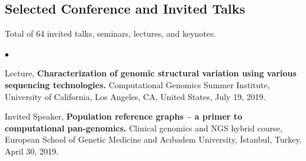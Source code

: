 \documentclass[margin,line]{res}
\newenvironment{list2}{
  \begin{list}{$\bullet$}{%
      \setlength{\itemsep}{0.1cm}
      \setlength{\parsep}{0in} \setlength{\parskip}{0in}
      \setlength{\topsep}{0in} \setlength{\partopsep}{0in} 
      \setlength{\leftmargin}{0.2in}}}{\end{list}}
\newcommand{\junk}[1]{}
\begin{document}
\begin{resume}
\vspace*{-.2cm}
\section{\sc Selected Conference and Invited Talks}
{\small
Total of 64 invited talks, seminars, lectures, and keynotes.
}\\

\begin{list2}

\junk{
 \item
  Invited Speaker, 
  {\bf Characterization of large-scale structural variants using Linked-Reads.}
  Biological Databases and Data Analysis Symposium, Koç University, Turkey, September 9, 2019.
  
  \item
  Invited Speaker, 
  {\bf Characterization of large-scale structural variants using Linked-Reads.} \textit{(in Turkish)}
  Data Science Summer School 2019, Sabancı University, Turkey, September 7, 2019.
  
  
  
  \item
  Conference Talk, 
  {\bf Characterization of large-scale structural variants using Linked-Reads.}
$27^{th}$ Annual
International Conference Intelligent Systems for Molecular Biology (ISMB/ECCB 2019), {\em HiTSeq Track},
Basel, Switzerland, July 23, 2019.
}

\item
  Lecture, 
  {\bf  Characterization of genomic structural variation using various sequencing technologies.}
  Computational Genomics Summer Institute, University of California, Los Angeles, CA, United States,
  July 19, 2019.


\item
Invited Speaker,
{\bf Population reference graphs – a primer to computational pan-genomics.}
 Clinical genomics and NGS hybrid course, European School of Genetic Medicine and Acıbadem University, İstanbul, Turkey, April 30, 2019.
 
 
  \junk{
  
  
\item
  Invited Speaker, 
  {\bf Algorithms to characterize genomic structural variation using high-throughput sequencing technologies.}
  Dept of Biomedical Informatics at Harvard Medical School, Boston, MA, United  States, November 29, 2018.
 
  
\item
  Lecture, 
  {\bf  Characterization of genomic structural variation using various sequencing technologies.}
  Computational Genomics Summer Institute, University of California, Los Angeles, CA, United States,
  July 17, 2018.
  }
  \junk{
\item
  Invited Speaker, 
  {\bf  Characterization of  genome structural variation and large inversions using high throughput sequencing.}
  ETH Zürich, Switzerland, May 7, 2018.
\item
  Invited Speaker, 
  {\bf  Characterization of  genome structural variation and large inversions using high throughput sequencing.}
  Indiana University, Bloomington, IN, United States, April 4, 2018.
}


\end{list2}
\end{resume}
\end{document}
